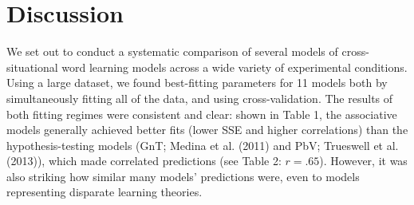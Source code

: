 \documentclass[10pt, letterpaper]{article}
\begin{document}
\begin{table}
\centering
\caption{\label{tab:gen-exp-table}Generalization experiment results.}
\centering
{}
\end{table}

\hypertarget{discussion}{%
\section{Discussion}\label{discussion}}

We set out to conduct a systematic comparison of several models of
cross-situational word learning models across a wide variety of
experimental conditions. Using a large dataset, we found best-fitting
parameters for 11 models both by simultaneously fitting all of the data,
and using cross-validation. The results of both fitting regimes were
consistent and clear: shown in Table 1, the associative models generally
achieved better fits (lower SSE and higher correlations) than the
hypothesis-testing models (GnT; Medina et al. (2011) and PbV; Trueswell
et al. (2013)), which made correlated predictions (see Table 2:
\(r=.65\)). However, it was also striking how similar many models'
predictions were, even to models representing disparate learning
theories.
\end{document}
